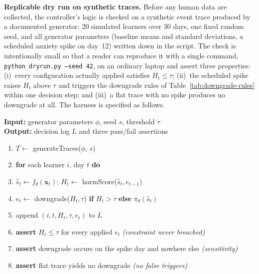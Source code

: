 \documentclass[12pt,a4paper]{article}
\begin{document}
\begin{justify}
\textbf{Replicable dry run on synthetic traces.} Before any human data are collected, the
controller's logic is checked on a synthetic event trace produced by a documented generator:
20 simulated learners over 30 days, one fixed random seed, and all generator parameters (baseline
means and standard deviations, a scheduled anxiety spike on day~12) written down in the script.
The check is intentionally small so that a reader can reproduce it with a single command,
\texttt{python dryrun.py --seed 42}, on an ordinary laptop and assert three properties:
(i)~every configuration actually applied satisfies $H_t \le \tau$; (ii)~the scheduled spike raises
$H_t$ above $\tau$ and triggers the downgrade rules of Table~\ref{tab:downgrade-rules} within one
decision step; and (iii)~a flat trace with no spike produces no downgrade at all. The harness is
specified as follows.

\begin{algorithm}[H]
\caption{Synthetic dry-run harness (replicability check, no human data)}
\label{alg:dryrun}
\begin{flushleft}
\fontsize{10pt}{12pt}\selectfont
\textbf{Input:} generator parameters $\phi$, seed $s$, threshold $\tau$ \\
\textbf{Output:} decision log $L$ and three pass/fail assertions
\end{flushleft}
\hrulefill
\vspace{0.2cm}
\begin{enumerate}
    \item $T \leftarrow$ generateTraces($\phi$, $s$)   %
    \item \textbf{for} each learner $i$, day $t$ \textbf{do}
    \item \quad $\hat{s}_t \leftarrow f_\theta(\mathbf{x}_t)$; \; $H_t \leftarrow$ harmScore($\hat{s}_t, e_{t-1}$)
    \item \quad $e_t \leftarrow$ downgrade($H_t, \tau$) \textbf{if} $H_t > \tau$ \textbf{else} $\pi_\theta(\hat{s}_t)$
    \item \quad append $(i, t, H_t, \tau, e_t)$ to $L$
    \item \textbf{assert} $H_t \le \tau$ for every applied $e_t$ \; \textit{(constraint never breached)}
    \item \textbf{assert} downgrade occurs on the spike day and nowhere else \; \textit{(sensitivity)}
    \item \textbf{assert} flat trace yields no downgrade \; \textit{(no false triggers)}
\end{enumerate}
\hrulefill
\end{algorithm}


\end{justify}
\end{document}
